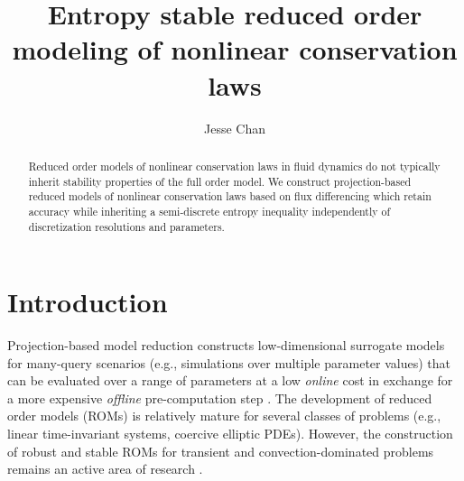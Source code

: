 \documentclass[preprint,10pt]{elsarticle}
\theoremstyle{definition}
\theoremstyle{lemma}
\theoremstyle{theorem}
\theoremstyle{assumption}
\begin{document}
\begin{frontmatter}
\title{Entropy stable reduced order modeling of nonlinear conservation laws}

\author[rice]{Jesse Chan}
\address[rice]{Department of Computational and Applied Mathematics, Rice University, 6100 Main St, Houston, TX, 77005}

\begin{abstract}
Reduced order models of nonlinear conservation laws in fluid dynamics do not typically inherit stability properties of the full order model. We construct projection-based reduced models of nonlinear conservation laws based on flux differencing which retain accuracy while inheriting a semi-discrete entropy inequality independently of discretization resolutions and parameters. 
\end{abstract}
\end{frontmatter}



\section{Introduction}

Projection-based model reduction constructs low-dimensional surrogate models for many-query scenarios (e.g., simulations over multiple parameter values) that can be evaluated over a range of parameters at a low \textit{online} cost in exchange for a more expensive \textit{offline} pre-computation step \cite{benner2015survey}.  The development of reduced order models (ROMs) is relatively mature for several classes of problems (e.g., linear time-invariant systems, coercive elliptic PDEs).  However, the construction of robust and stable ROMs for transient and convection-dominated problems remains an active area of research \cite{cagniart2019model}.  
\end{document}
